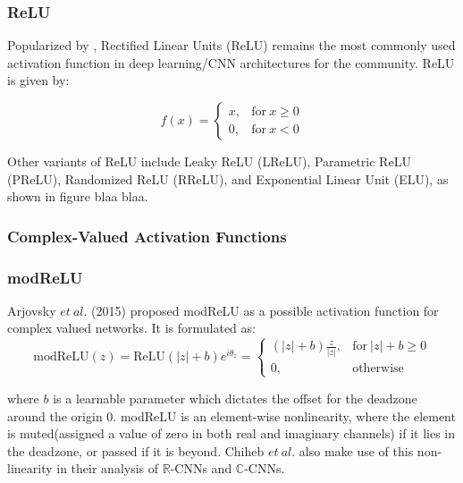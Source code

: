    \subsubsection{ReLU}
   
Popularized by \cite{krizhevsky2012imagenet}, Rectified Linear Units (ReLU) \cite{nair2010rectified} remains the most commonly used activation function in deep learning/CNN architectures for the community. ReLU is given by:

\begin{equation}
f(x) =  
\begin{cases} 
x , &\textrm{for} \ x\ge 0\\
0 , &\textrm{for} \ x < 0
\end{cases}
\end{equation}
 
 
 Other variants of ReLU include Leaky ReLU (LReLU), Parametric ReLU (PReLU), Randomized ReLU (RReLU), and Exponential Linear Unit (ELU), as shown in figure blaa blaa. 
  
 \subsubsection{Complex-Valued Activation Functions}
 
 
 \subsubsection{modReLU}
Arjovsky $et \ al.$ (2015) \cite{ArjovskySB15} proposed modReLU as a possible activation function for complex valued networks. It is formulated as:
 \begin{equation}
\mathrm{modReLU}(z) = \mathrm{ReLU}(|z| + b)e^{i\theta_{z}}
{}=\begin{cases} (|z| + b)\frac{z}{|z|} , &\mathrm{for} \ |z| + b\ge 0 \\ 0 , &\textrm{otherwise} \end{cases}
\end{equation}

where $b$ is a learnable parameter which dictates the offset for the deadzone around the origin $0$. modReLU is an element-wise nonlinearity, where the element is muted(assigned a value of zero in both real and imaginary channels) if it lies in the deadzone, or passed if it is beyond. Chiheb $et \ al.$ \cite{trabelsi2018deep} also make use of this non-linearity in their analysis of $\mathbb{R}$-CNNs and $\mathbb{C}$-CNNs.

